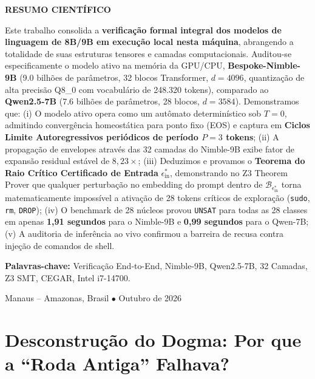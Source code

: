 \documentclass[11pt,a4paper]{article}
\theoremstyle{definition}
\begin{document}
\begin{titlepage}
    \vspace{0.4cm}
    \begin{minipage}{0.95\textwidth}
        \small
        \begin{center}\textbf{RESUMO CIENTÍFICO}\end{center}
        \noindent Este trabalho consolida a \textbf{verificação formal integral dos modelos de linguagem de 8B/9B em execução local nesta máquina}, abrangendo a totalidade de suas estruturas tensores e camadas computacionais. Auditou-se especificamente o modelo ativo na memória da GPU/CPU, \textbf{Bespoke-Nimble-9B} (9.0 bilhões de parâmetros, 32 blocos Transformer, $d=4096$, quantização de alta precisão Q8\_0 com vocabulário de 248.320 tokens), comparado ao \textbf{Qwen2.5-7B} (7.6 bilhões de parâmetros, 28 blocos, $d=3584$). Demonstramos que: (i) O modelo ativo opera como um autômato determinístico sob $T=0$, admitindo convergência homeostática para ponto fixo (EOS) e captura em \textbf{Ciclos Limite Autoregressivos periódicos de período $P=3$ tokens}; (ii) A propagação de envelopes através das 32 camadas do Nimble-9B exibe fator de expansão residual estável de $8{,}23\times$; (iii) Deduzimos e provamos o \textbf{Teorema do Raio Crítico Certificado de Entrada} $\epsilon_{\text{in}}^*$, demonstrando no Z3 Theorem Prover que qualquer perturbação no embedding do prompt dentro de $\mathcal{B}_{\epsilon_{\text{in}}^*}$ torna matematicamente impossível a ativação de 28 tokens críticos de exploração (\texttt{sudo}, \texttt{rm}, \texttt{DROP}); (iv) O benchmark de 28 núcleos provou \texttt{UNSAT} para todas as 28 classes em apenas \textbf{1,91 segundos} para o Nimble-9B e \textbf{0,99 segundos} para o Qwen-7B; (v) A auditoria de inferência ao vivo confirmou a barreira de recusa contra injeção de comandos de shell.
        \vspace{0.2cm}
        
        \noindent\textbf{Palavras-chave:} Verificação End-to-End, Nimble-9B, Qwen2.5-7B, 32 Camadas, Z3 SMT, CEGAR, Intel i7-14700.
    \end{minipage}
    
    \vfill
    {\small Manaus -- Amazonas, Brasil $\bullet$ Outubro de 2026}
\end{titlepage}

\newpage
\setcounter{page}{2}

\section{Desconstrução do Dogma: Por que a ``Roda Antiga'' Falhava?}
\end{document}
